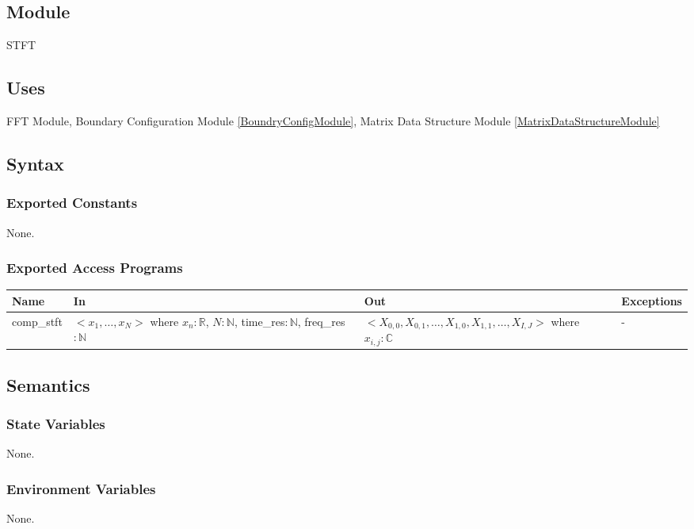 \documentclass[12pt, titlepage]{article}
\begin{document}

\subsection{Module}
STFT

\subsection{Uses}
FFT Module, Boundary Configuration Module \ref{BoundryConfigModule},  Matrix Data Structure Module \ref{MatrixDataStructureModule}
\subsection{Syntax}

\subsubsection{Exported Constants}
None.
\subsubsection{Exported Access Programs}

\begin{center}
\begin{tabular}{p{2cm} p{4cm} p{4cm} p{2cm}}
\hline
\textbf{Name} & \textbf{In} & \textbf{Out} & \textbf{Exceptions} \\
\hline
comp\_stft & $< x_1, \dots, x_N>$ where $x_n:\mathbb{R}$, $N:\mathbb{N} $, time\_res$:\mathbb{N}$, freq\_res$:\mathbb{N}$ & $< X_{0,0},X_{0,1},\dots,X_{1,0}, X_{1,1},\dots,X_{I,J}>$ where $ x_{i,j}:\mathbb{C}$ & - \\
\hline
\end{tabular}
\end{center}

\subsection{Semantics}

\subsubsection{State Variables}
None.

\subsubsection{Environment Variables}
None.
\end{document}
